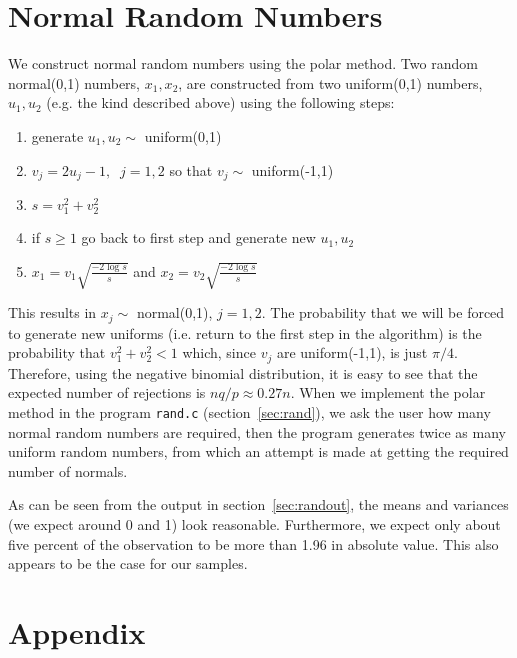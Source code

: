 \documentclass{article}
\begin{document}
\section{Normal Random Numbers}
We construct normal random numbers using the polar method.  
Two random normal(0,1) numbers, $x_1,x_2$, are constructed from two 
uniform(0,1) numbers, $u_1,u_2$ (e.g. the kind described above) 
using the following steps:
\begin{enumerate}
\item generate $u_1, u_2 \sim$ uniform(0,1)
\item $v_j = 2u_j - 1,\;\; j=1,2$ so that $v_j \sim$ uniform(-1,1)
\item $s = v_1^2 + v_2^2$
\item if $s\geq 1$ go back to first step and generate new $u_1,u_2$
\item $x_1 = v_1 \sqrt{\frac{-2 \log s}{s}}$ and 
$x_2 = v_2 \sqrt{\frac{-2 \log s}{s}}$ 
\end{enumerate}
This results in $x_j \sim$ normal(0,1), $j=1,2$.  The probability
that we will be forced to generate new uniforms (i.e. return to the first
step in the algorithm) is the probability that $v_1^2 +v_2^2 < 1$ which,
since $v_j$ are uniform(-1,1), is just $\pi/4$.  Therefore, using the negative
binomial distribution, it is easy to see that the expected number of rejections
is $nq/p \approx 0.27n$.  When we implement the polar method in the program
{\tt rand.c} (section~\ref{sec:rand}), we ask the user how many normal random
numbers are required, then the program generates twice as many uniform 
random numbers, from which an attempt is made at getting the required number
of normals. 

As can be seen from the output in section~\ref{sec:randout}, 
the means and variances (we expect around
0 and 1) look reasonable.  Furthermore, we expect only about five percent
of the observation to be more than 1.96 in absolute value.  This also appears
to be the case for our samples.

\section{Appendix}
\end{document}
